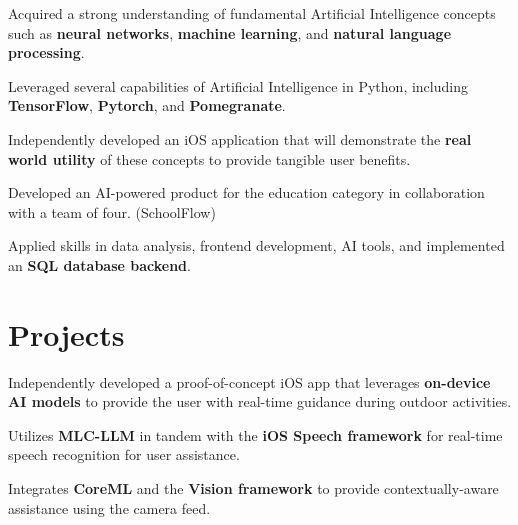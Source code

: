 \documentclass[letterpaper,10pt]{article}
\begin{document}
\begin{resume_list}
  \item Acquired a strong understanding of fundamental Artificial Intelligence concepts such as \textbf{neural networks}, \textbf{machine learning}, and \textbf{natural language processing}.
  \vspace{1pt}
  \item Leveraged several capabilities of Artificial Intelligence in Python, including \textbf{TensorFlow}, \textbf{Pytorch}, and \textbf{Pomegranate}.
  \vspace{1pt}
  \item Independently developed an iOS application that will demonstrate the \textbf{real world utility} of these concepts to provide tangible user benefits.
  \vspace{2pt}
\end{resume_list}

\begin{resume_list}
  \item Developed an AI-powered product for the education category in collaboration with a team of four. (SchoolFlow)
  \vspace{1pt}
  \item Applied skills in data analysis, frontend development, AI tools, and implemented an \textbf{SQL database backend}.
  \vspace{-2pt}
\end{resume_list}


\vspace{0pt}
\section{\large{Projects}}

\vspace{1pt}
\begin{resume_list}
  \vspace{1pt}
    \item Independently developed a proof-of-concept iOS app that leverages \textbf{on-device AI models} to provide the user with real-time guidance during outdoor activities.
    \vspace{1pt}
    \item Utilizes \textbf{MLC-LLM} in tandem with the \textbf{iOS Speech framework} for real-time speech recognition for user assistance.
    \vspace{1pt}
    \item Integrates \textbf{CoreML} and the \textbf{Vision framework} to provide contextually-aware assistance using the camera feed.
\end{resume_list}
\end{document}
